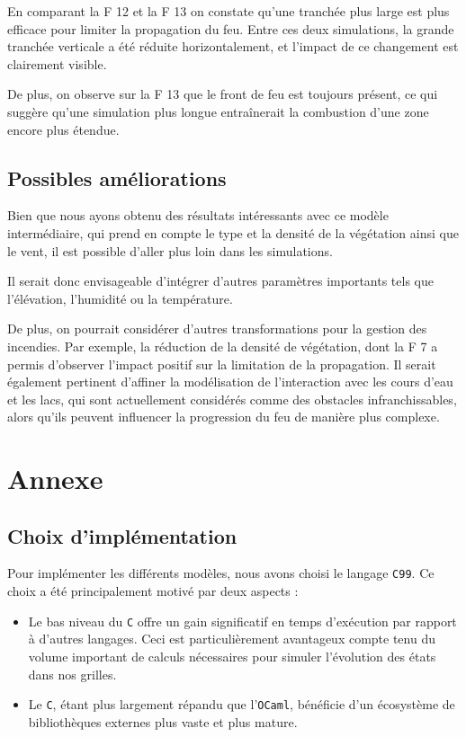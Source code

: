 \documentclass[12pt]{article}
\newcommand{\fig}[1]{
    F\resizebox{!}{1.3ex}{IGURE} #1
}
\begin{document}
En comparant la\fig{12}et la\fig{13}on constate qu'une tranchée plus large est plus efficace pour limiter la propagation du feu. Entre ces deux simulations, la grande tranchée verticale a été réduite horizontalement, et l'impact de ce changement est clairement visible.

De plus, on observe sur la\fig{13}que le front de feu est toujours présent, ce qui suggère qu'une simulation plus longue entraînerait la combustion d'une zone encore plus étendue.

\subsection{Possibles améliorations}

Bien que nous ayons obtenu des résultats intéressants avec ce modèle intermédiaire, qui prend en compte le type et la densité de la végétation ainsi que le vent, il est possible d'aller plus loin dans les simulations.

Il serait donc envisageable d'intégrer d'autres paramètres importants tels que l'élévation, l'humidité ou la température.

De plus, on pourrait considérer d'autres transformations pour la gestion des incendies. Par exemple, la réduction de la densité de végétation, dont la\fig{7}a permis d'observer l'impact positif sur la limitation de la propagation. Il serait également pertinent d'affiner la modélisation de l'interaction avec les cours d'eau et les lacs, qui sont actuellement considérés comme des obstacles infranchissables, alors qu'ils peuvent influencer la progression du feu de manière plus complexe.

\section{Annexe}

\subsection{Choix d'implémentation}

Pour implémenter les différents modèles, nous avons choisi le langage \texttt{C99}. Ce choix a été principalement motivé par deux aspects :

\begin{itemize}
    \item Le bas niveau du \texttt{C} offre un gain significatif en temps d'exécution par rapport à d'autres langages. Ceci est particulièrement avantageux compte tenu du volume important de calculs nécessaires pour simuler l'évolution des états dans nos grilles.
    \item Le \texttt{C}, étant plus largement répandu que l'\texttt{OCaml}, bénéficie d'un écosystème de bibliothèques externes plus vaste et plus mature.
\end{itemize}
\end{document}
